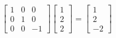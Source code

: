 \documentclass[preview]{standalone}
\begin{document}
\begin{align*}
\begin{bmatrix} 1 & 0 & 0 \\ 0 & 1 & 0 \\ 0 & 0 & -1 \end{bmatrix} \begin{bmatrix} 1 \\ 2 \\ 2 \end{bmatrix} = \begin{bmatrix} 1 \\ 2 \\ -2 \end{bmatrix}
\end{align*}
\end{document}
